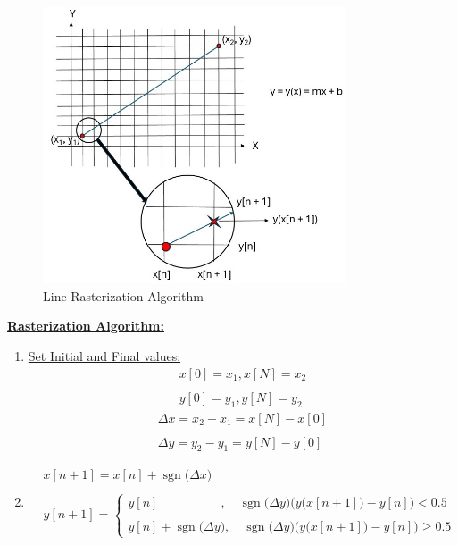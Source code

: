 \documentclass{article}
\DeclareMathOperator{\sgn}{sgn}
\begin{document}
\begin{figure}[ht!]
\centering
\includegraphics[width=90mm]{Line Rasterization.jpg}
\caption{Line Rasterization Algorithm \label{overflow}}
\end{figure}

\underline{\textbf{Rasterization Algorithm:}} \\
\begin{enumerate}
    \item \underline{Set Initial and Final values:}
           \begin{align*}
                x[0] = x_{1}, x[N] = x_{2} \\ \\
                y[0] = y_{1}, y[N] = y_{2}
             \end{align*}
           \begin{align*}     
                \Delta x = x_{2} - x_{1} = x[N] - x[0] \\ \\
                \Delta y = y_{2} - y_{1} = y[N] - y[0] 
             \end{align*}
    \item {} 
           \begin{align*}
                &x[n + 1] = x[n] + \sgn\big(\Delta x\big) \\ \\ 
                &y[n + 1] = \begin{cases}
                                y[n] \quad \quad \quad \quad \quad, \quad \sgn\big(\Delta y\big)\Big(y\big(x[n + 1]\big) - y[n]\Big) < 0.5 \\ \\
                                y[n] + \sgn\big(\Delta y\big), \quad \sgn\big(\Delta y\big)\Big(y\big(x[n + 1]\big) - y[n]\Big) \geq 0.5 
                              \end{cases} 
            \end{align*}
\end{enumerate}
\end{document}
